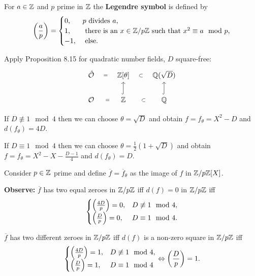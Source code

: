 \begin{remin}
For $a \in \mathbb{Z}$ and $p$ prime in $\mathbb{Z}$ the \textbf{Legendre symbol} is defined by
\[ \left(\frac{a}{p}\right) = \begin{cases}
0, & p \text{ divides } a, \\
1, & \text{ there is an } x \in \mathbb{Z} / p\mathbb{Z} \text{ such that } x^2 \equiv a \mod p,\\
-1, & \text{ else.}\\
\end{cases}
\]
\end{remin}

\begin{Bsp}
Apply Proposition 8.15 for quadratic number fields, $D$ square-free:
\[ \begin{tikzcd}
\hat{\O} 
	\arrow[draw=none]{r}[sloped,auto=false]{=} &\Z[\theta] 
	\arrow[draw=none]{r}[sloped,auto=false]{\subset} & \Q(\sqrt{D}) \\
\O 
	\arrow[draw=none]{r}[sloped,auto=false]{=} & \Z
		\arrow[u, hook]
	\arrow[draw=none]{r}[sloped,auto=false]{\subset} & \Q
		\arrow[u, hook]
\end{tikzcd}
\]
\end{Bsp}


\begin{remin}
	If $D \not\equiv 1 \mod 4$ then we can choose $\theta = \sqrt{D}$ and obtain
	$f = f_\theta = X^2- D$ and $d(f_\theta) = 4D$.
	
	
	If $D \equiv 1 \mod 4$ then we can choose $\theta = \frac{1}{2}(1+\sqrt{D})$ and obtain
	$f = f_\theta = X^2-X - \frac{D-1}{4}$ and $d(f_\theta) = D$.
\end{remin}

Consider $p \in\mathbb{Z}$ prime and define $\overline{f} = \overline{f}_\theta$ as the image of $f$ in $\mathbb{Z} / p\mathbb{Z} [X]$.

\bigskip
\textbf{Observe:} $\overline{f}$ has two equal zeroes in $\mathbb{Z} / p\mathbb{Z}$ iff $d(f) = 0$ in $\mathbb{Z} / p\mathbb{Z}$ iff 
\[ \begin{cases}
\left(\frac{4D}{p}\right) = 0, & D \not \equiv 1 \mod 4, \\
\left(\frac{D}{p}\right) = 0, & D \equiv 1 \mod 4. \\
\end{cases}
\]

\bigskip $\overline{f}$ has two different zeroes in  $\mathbb{Z} / p\mathbb{Z}$ iff $d(f)$ is a non-zero square in $\mathbb{Z} / p\mathbb{Z}$ iff 
\[ \begin{cases}
\left(\frac{4D}{p}\right) = 1, & D \not \equiv 1 \mod 4, \\
\left(\frac{D}{p}\right) = 1, & D \equiv 1 \mod 4 \\
\end{cases}
\Leftrightarrow \left(\frac{D}{p}\right) = 1.
\]

